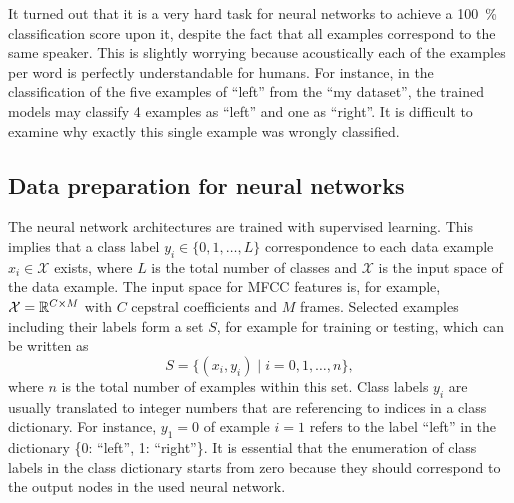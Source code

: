 \FloatBarrier
\noindent
It turned out that it is a very hard task for neural networks to achieve a \SI{100}{\percent} classification score upon it, despite the fact that all examples correspond to the same speaker.
This is slightly worrying because acoustically each of the examples per word is perfectly understandable for humans.
For instance, in the classification of the five examples of \enquote{left} from the \enquote{my dataset}, the trained models may classify 4 examples as \enquote{left} and one as \enquote{right}.
It is difficult to examine why exactly this single example was wrongly classified.



\subsection{Data preparation for neural networks}\label{sec:exp_data_prep}
The neural network architectures are trained with supervised learning.
This implies that a class label $y_i \in \{0, 1, \dots, L\}$ correspondence to each data example $x_i \in \mathcal{X}$ exists, where $L$ is the total number of classes and $\mathcal{X}$ is the input space of the data example.
The input space for MFCC features is, for example, $\mathcal{X} = \mathbb{R}^{C \times M}$ with $C$ cepstral coefficients and $M$ frames.
Selected examples including their labels form a set $S$, for example for training or testing, which can be written as
\begin{equation}\label{eq:exp_dataset}
  S = \{ (x_i, y_i) \mid i = 0, 1, \dots, n \},
\end{equation}
where $n$ is the total number of examples within this set.
Class labels $y_i$ are usually translated to integer numbers that are referencing to indices in a class dictionary.
For instance, $y_1 = 0$ of example $i=1$ refers to the label \enquote{left} in the dictionary \{0: \enquote{left}, 1: \enquote{right}\}.
It is essential that the enumeration of class labels in the class dictionary starts from zero because they should correspond to the output nodes in the used neural network.


